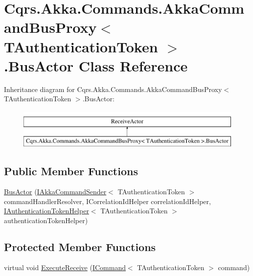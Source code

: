 \hypertarget{classCqrs_1_1Akka_1_1Commands_1_1AkkaCommandBusProxy_1_1BusActor}{}\section{Cqrs.\+Akka.\+Commands.\+Akka\+Command\+Bus\+Proxy$<$ T\+Authentication\+Token $>$.Bus\+Actor Class Reference}
\label{classCqrs_1_1Akka_1_1Commands_1_1AkkaCommandBusProxy_1_1BusActor}
Inheritance diagram for Cqrs.\+Akka.\+Commands.\+Akka\+Command\+Bus\+Proxy$<$ T\+Authentication\+Token $>$.Bus\+Actor\+:\begin{figure}[H]
\begin{center}
\leavevmode
\includegraphics[height=2.000000cm]{classCqrs_1_1Akka_1_1Commands_1_1AkkaCommandBusProxy_1_1BusActor}
\end{center}
\end{figure}
\subsection*{Public Member Functions}
\begin{DoxyCompactItemize}
\item 
\hyperlink{classCqrs_1_1Akka_1_1Commands_1_1AkkaCommandBusProxy_1_1BusActor_a3a91b0c5338c8fbd59bd7e5751ba2f32}{Bus\+Actor} (\hyperlink{interfaceCqrs_1_1Akka_1_1Commands_1_1IAkkaCommandSender}{I\+Akka\+Command\+Sender}$<$ T\+Authentication\+Token $>$ command\+Handler\+Resolver, I\+Correlation\+Id\+Helper correlation\+Id\+Helper, \hyperlink{interfaceCqrs_1_1Authentication_1_1IAuthenticationTokenHelper}{I\+Authentication\+Token\+Helper}$<$ T\+Authentication\+Token $>$ authentication\+Token\+Helper)
\end{DoxyCompactItemize}
\subsection*{Protected Member Functions}
\begin{DoxyCompactItemize}
\item 
virtual void \hyperlink{classCqrs_1_1Akka_1_1Commands_1_1AkkaCommandBusProxy_1_1BusActor_a2218f176012e4074308d8de36f1f48a2}{Execute\+Receive} (\hyperlink{interfaceCqrs_1_1Commands_1_1ICommand}{I\+Command}$<$ T\+Authentication\+Token $>$ command)
\end{DoxyCompactItemize}
